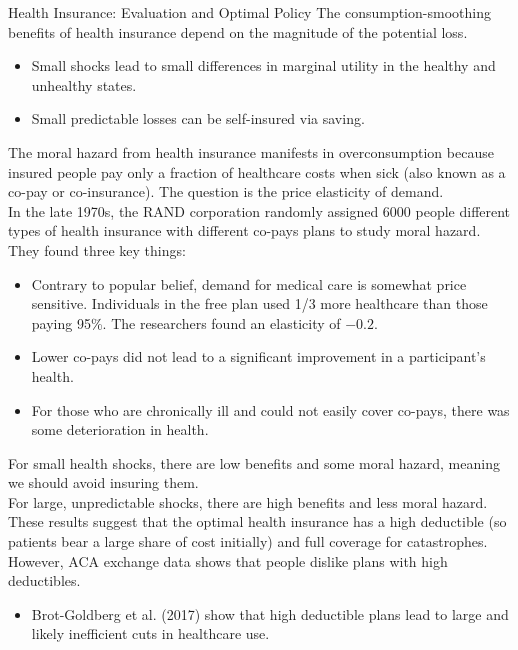 \documentclass[10pt]{extarticle}
\begin{document}
  \begin{problem}{Health Insurance: Evaluation and Optimal Policy}
    The consumption-smoothing benefits of health insurance depend on the magnitude of the potential loss.
    \begin{itemize}
      \item Small shocks lead to small differences in marginal utility in the healthy and unhealthy states.
      \item Small predictable losses can be self-insured via saving.
    \end{itemize}
    The moral hazard from health insurance manifests in overconsumption because insured people pay only a fraction of healthcare costs when sick (also known as a co-pay or co-insurance). The question is the price elasticity of demand.\\

    In the late 1970s, the RAND corporation randomly assigned 6000 people different types of health insurance with different co-pays plans to study moral hazard. They found three key things:
    \begin{itemize}
      \item Contrary to popular belief, demand for medical care is somewhat price sensitive. Individuals in the free plan used 1/3 more healthcare than those paying 95\%. The researchers found an elasticity of $-0.2$.
      \item Lower co-pays did not lead to a significant improvement in a participant's health.
      \item For those who are chronically ill and could not easily cover co-pays, there was some deterioration in health.
    \end{itemize}
    For small health shocks, there are low benefits and some moral hazard, meaning we should avoid insuring them.\\

    For large, unpredictable shocks, there are high benefits and less moral hazard.\\

    These results suggest that the optimal health insurance has a high deductible (so patients bear a large share of cost initially) and full coverage for catastrophes.\\

    However, ACA exchange data shows that people dislike plans with high deductibles.
    \begin{itemize}
      \item Brot-Goldberg et al. (2017) show that high deductible plans lead to large and likely inefficient cuts in healthcare use.
    \end{itemize}
  \end{problem}
\end{document}
